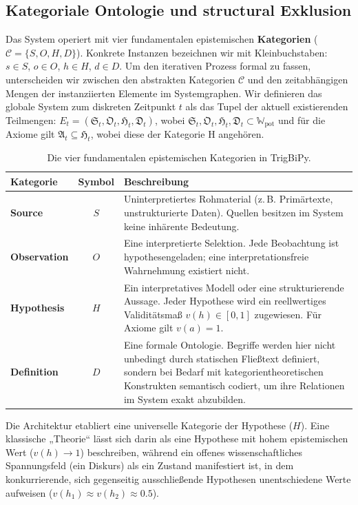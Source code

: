 \documentclass[11pt, a4paper]{article}
\begin{document}
	\subsection{Kategoriale Ontologie und structural Exklusion}
	Das System operiert mit vier fundamentalen epistemischen \textbf{Kategorien} ($\mathcal{C} = \{S, O, H, D\}$). Konkrete Instanzen bezeichnen wir mit Kleinbuchstaben: $s \in S$, $o \in O$, $h \in H$, $d \in D$.
	Um den iterativen Prozess formal zu fassen, unterscheiden wir zwischen den abstrakten Kategorien $\mathcal{C}$ und den zeitabhängigen Mengen der instanziierten Elemente im Systemgraphen. Wir definieren das globale System zum diskreten Zeitpunkt $t$ als das Tupel der aktuell existierenden Teilmengen: $E_t = (\mathfrak{S}_t, \mathfrak{O}_t, \mathfrak{H}_t, \mathfrak{D}_t)$, wobei $\mathfrak{S}_t, \mathfrak{O}_t, \mathfrak{H}_t, \mathfrak{D}_t \subset \mathbb{W}_{\text{pot}}$ und für die Axiome gilt $\mathfrak{A}_t \subseteq \mathfrak{H}_t$, wobei diese der Kategorie H angehören.
	
	\begin{table}[ht]
		\centering
		\begin{tabular}{l c p{10cm}}
			\toprule
			\textbf{Kategorie} & \textbf{Symbol} & \textbf{Beschreibung} \\
			\midrule
			\textbf{Source} & $S$ & Uninterpretiertes Rohmaterial (z.\,B. Primärtexte, unstrukturierte Daten). Quellen besitzen im System keine inhärente Bedeutung. \\
			\addlinespace
			\textbf{Observation} & $O$ & Eine interpretierte Selektion. Jede Beobachtung ist hypothesengeladen; eine interpretationsfreie Wahrnehmung existiert nicht. \\
			\addlinespace
			\textbf{Hypothesis} & $H$ & Ein interpretatives Modell oder eine strukturierende Aussage. Jeder Hypothese wird ein reellwertiges Validitätsmaß $v(h) \in [0, 1]$ zugewiesen. Für Axiome gilt $v(a) = 1$.\\
			\addlinespace
			\textbf{Definition} & $D$ & Eine formale Ontologie. Begriffe werden hier nicht unbedingt durch statischen Fließtext definiert, sondern bei Bedarf mit kategorientheoretischen Konstrukten semantisch codiert, um ihre Relationen im System exakt abzubilden. \\
			\bottomrule
		\end{tabular}
		\caption{Die vier fundamentalen epistemischen Kategorien in TrigBiPy.}
	\end{table}
	
	Die Architektur etabliert eine universelle Kategorie der Hypothese ($H$). Eine klassische „Theorie“ lässt sich darin als eine Hypothese mit hohem epistemischen Wert ($v(h) \to 1$) beschreiben, während ein offenes wissenschaftliches Spannungsfeld (ein Diskurs) als ein Zustand manifestiert ist, in dem konkurrierende, sich gegenseitig ausschließende Hypothesen unentschiedene Werte aufweisen ($v(h_1) \approx v(h_2) \approx 0.5$).
	
\end{document}
